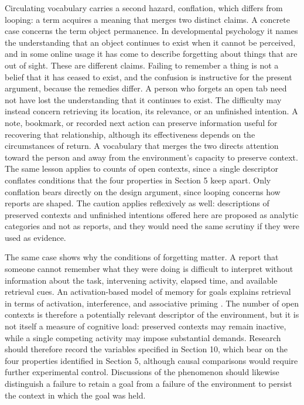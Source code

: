 \documentclass[12pt]{article}
\begin{document}
Circulating vocabulary carries a second hazard, conflation, which differs from looping: a term acquires a meaning that merges two distinct claims. A concrete case concerns the term object permanence. In developmental psychology it names the understanding that an object continues to exist when it cannot be perceived, and in some online usage it has come to describe forgetting about things that are out of sight. These are different claims. Failing to remember a thing is not a belief that it has ceased to exist, and the confusion is instructive for the present argument, because the remedies differ. A person who forgets an open tab need not have lost the understanding that it continues to exist. The difficulty may instead concern retrieving its location, its relevance, or an unfinished intention. A note, bookmark, or recorded next action can preserve information useful for recovering that relationship, although its effectiveness depends on the circumstances of return. A vocabulary that merges the two directs attention toward the person and away from the environment's capacity to preserve context. The same lesson applies to counts of open contexts, since a single descriptor conflates conditions that the four properties in Section 5 keep apart. Only conflation bears directly on the design argument, since looping concerns how reports are shaped. The caution applies reflexively as well: descriptions of preserved contexts and unfinished intentions offered here are proposed as analytic categories and not as reports, and they would need the same scrutiny if they were used as evidence.

The same case shows why the conditions of forgetting matter. A report that someone cannot remember what they were doing is difficult to interpret without information about the task, intervening activity, elapsed time, and available retrieval cues. An activation-based model of memory for goals explains retrieval in terms of activation, interference, and associative priming \cite{altmann2002memory}. The number of open contexts is therefore a potentially relevant descriptor of the environment, but it is not itself a measure of cognitive load: preserved contexts may remain inactive, while a single competing activity may impose substantial demands. Research should therefore record the variables specified in Section 10, which bear on the four properties identified in Section 5, although causal comparisons would require further experimental control. Discussions of the phenomenon should likewise distinguish a failure to retain a goal from a failure of the environment to persist the context in which the goal was held.
\end{document}
